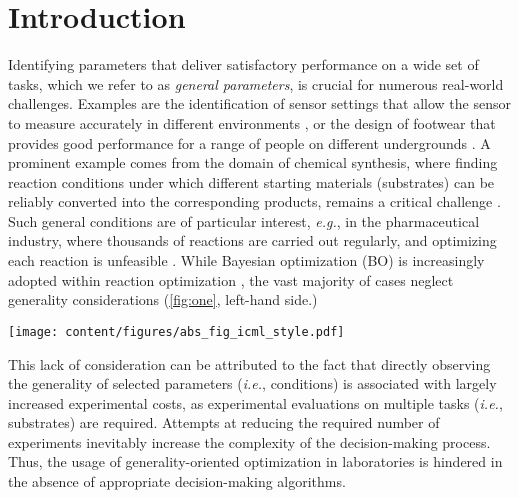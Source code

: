 \section{Introduction}

Identifying parameters that deliver satisfactory performance on a wide set of tasks, which we refer to as \emph{general parameters}, is crucial for numerous real-world challenges. 
Examples are the identification of sensor settings that allow the sensor to measure accurately in different environments \citep{guntner_breath_2019}, or the design of footwear that provides good performance for a range of people on different undergrounds \citep{promjun_factors_2012}.
A prominent example comes from the domain of chemical synthesis, where finding reaction conditions under which different starting materials (substrates) can be reliably converted into the corresponding products, remains a critical challenge \citep{feng_general_2015, jagadeesh_mof-derived_2017, wagen_screening_2022, prieto_kullmer_accelerating_2022, rein_generality-oriented_2023, betinol_data-driven_2023, rana_standardizing_2024, schmid_catalysing_2024, sivilotti_active_2025}.
Such general conditions are of particular interest, \textit{e.g.}, in the pharmaceutical industry, where thousands of reactions are carried out regularly, and optimizing each reaction is unfeasible \citep{wagen_screening_2022}.
While Bayesian optimization (BO) is increasingly adopted within reaction optimization \citep{clayton_algorithms_2019, shields_bayesian_2021, guo_bayesian_2023, tom_self-driving_2024}, the vast majority of cases neglect generality considerations (\cref{fig:one}, left-hand side.)
%
\begin{figure*}
  \texttt{[image: content/figures/abs\_fig\_icml\_style.pdf]}
  \caption{
  \textit{Left:} While conditions can be optimized to maximize the reaction outcome for only one substrate (red), generality-optimized conditions provide a satisfactory reaction outcome for multiple substrates. \textit{Right:} Optimization loop for generality-oriented optimization under partial monitoring.}
  \label{fig:one}
\end{figure*}
%
This lack of consideration can be attributed to the fact that directly observing the generality of selected parameters (\textit{i.e.}, conditions) is associated with largely increased experimental costs, as experimental evaluations on multiple tasks (\textit{i.e.}, substrates) are required.
Attempts at reducing the required number of experiments inevitably increase the complexity of the decision-making process. Thus, the usage of generality-oriented optimization in laboratories is hindered in the absence of appropriate decision-making algorithms. 
